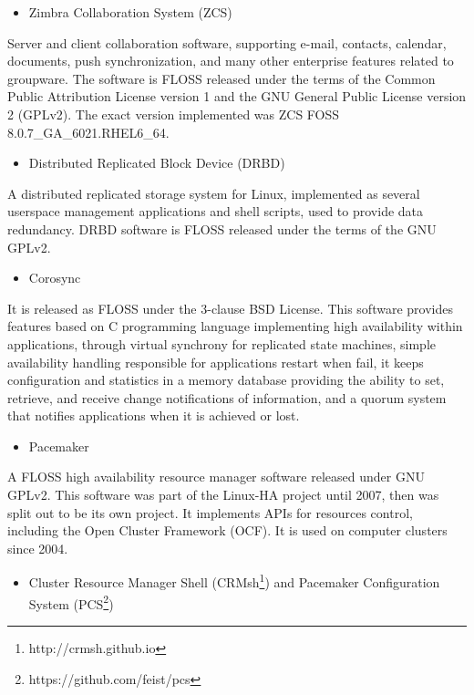 \documentclass[a4paper, 12pt]{book}
\begin{document}
\begin{itemize}
	\item Zimbra Collaboration System (ZCS)
\end{itemize}

\noindent Server and client collaboration software, supporting e-mail, contacts, calendar, documents, push synchronization, and many other enterprise features related to groupware. The software is FLOSS released under the terms of the Common Public Attribution License version 1 and the GNU General Public License version 2 (GPLv2). The exact version implemented was ZCS FOSS  8.0.7\_GA\_6021.RHEL6\_64.

\begin{itemize}
	\item Distributed Replicated Block Device (DRBD)
\end{itemize}

\noindent A distributed replicated storage system for Linux, implemented as several userspace management applications and shell scripts, used to provide data redundancy. DRBD software is FLOSS released under the terms of the GNU GPLv2. 

\begin{itemize}
	\item Corosync
\end{itemize}

\noindent It is released as FLOSS under the 3-clause BSD License. This software provides features based on C programming language implementing high availability within applications, through virtual synchrony for replicated state machines, simple availability handling responsible for applications restart when fail, it keeps configuration and statistics in a memory database providing the ability to set, retrieve, and receive change notifications of information, and a quorum system that notifies applications when it is achieved or lost.

\begin{itemize}
	\item Pacemaker
\end{itemize}

\noindent A FLOSS high availability resource manager software released under GNU GPLv2. This software was part of the Linux-HA project until 2007, then was split out to be its own project. It implements APIs for resources control, including the Open Cluster Framework (OCF). It is used on computer clusters since 2004.

\begin{itemize}
	\item Cluster Resource Manager Shell (CRMsh\footnote{http://crmsh.github.io}) and Pacemaker Configuration System (PCS\footnote{https://github.com/feist/pcs})
\end{itemize}
\end{document}
